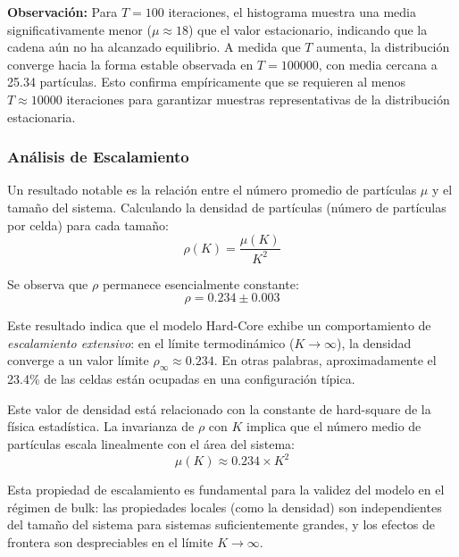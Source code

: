 \textbf{Observación:} Para $T=100$ iteraciones, el histograma muestra una media significativamente menor ($\mu \approx 18$) que el valor estacionario, indicando que la cadena aún no ha alcanzado equilibrio. A medida que $T$ aumenta, la distribución converge hacia la forma estable observada en $T=100000$, con media cercana a 25.34 partículas. Esto confirma empíricamente que se requieren al menos $T \approx 10000$ iteraciones para garantizar muestras representativas de la distribución estacionaria.

\vspace{1cm}

\subsubsection{Análisis de Escalamiento}

Un resultado notable es la relación entre el número promedio de partículas $\mu$ y el tamaño del sistema. Calculando la densidad de partículas (número de partículas por celda) para cada tamaño:
\begin{equation}
\rho(K) = \frac{\mu(K)}{K^2}
\end{equation}

Se observa que $\rho$ permanece esencialmente constante:
\begin{equation}
\rho = 0.234 \pm 0.003
\end{equation}

Este resultado indica que el modelo Hard-Core exhibe un comportamiento de \textit{escalamiento extensivo}: en el límite termodinámico ($K \to \infty$), la densidad converge a un valor límite $\rho_\infty \approx 0.234$. En otras palabras, aproximadamente el 23.4\% de las celdas están ocupadas en una configuración típica.

Este valor de densidad está relacionado con la constante de hard-square de la física estadística. La invarianza de $\rho$ con $K$ implica que el número medio de partículas escala linealmente con el área del sistema:
\begin{equation}
\mu(K) \approx 0.234 \times K^2
\end{equation}

Esta propiedad de escalamiento es fundamental para la validez del modelo en el régimen de bulk: las propiedades locales (como la densidad) son independientes del tamaño del sistema para sistemas suficientemente grandes, y los efectos de frontera son despreciables en el límite $K \to \infty$.

